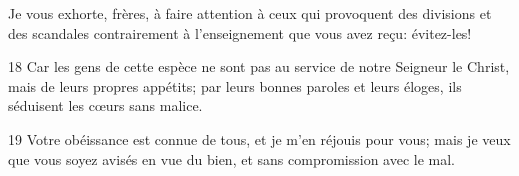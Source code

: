 Je vous exhorte, frères, à faire attention à ceux qui provoquent des divisions et des scandales contrairement à l’enseignement que vous avez reçu: évitez-les!

18 Car les gens de cette espèce ne sont pas au service de notre Seigneur le Christ, mais de leurs propres appétits; par leurs bonnes paroles et leurs éloges, ils séduisent les cœurs sans malice.

19 Votre obéissance est connue de tous, et je m’en réjouis pour vous; mais je veux que vous soyez avisés en vue du bien, et sans compromission avec le mal.